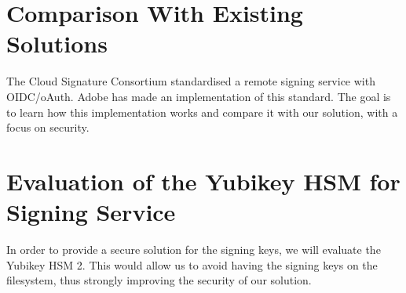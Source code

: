 \section{Comparison With Existing Solutions}
\label{section:comparison}

The Cloud Signature Consortium standardised a remote signing service with OIDC/oAuth.
Adobe has made an implementation of this standard.
The goal is to learn how this implementation works and compare it with our solution, with a focus on security.

\section{Evaluation of the Yubikey HSM for Signing Service}
\label{section:evaluateyubikey}

In order to provide a secure solution for the signing keys, we will evaluate the Yubikey HSM 2.
This would allow us to avoid having the signing keys on the filesystem, thus strongly improving the security of our solution.


